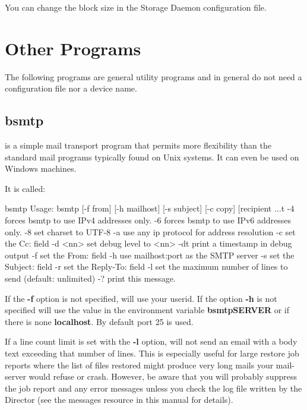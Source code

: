 You can change the block size in the Storage Daemon configuration file.




\section{Other Programs}

The following programs are general utility programs and in general do not need
a configuration file nor a device name.


\subsection{bsmtp}
\label{bsmtp}

 is a simple mail transport program that permits more flexibility
than the standard mail programs typically found on Unix systems. It can even
be used on Windows machines.

It is called:
\begin{commands}{bsmtp}
Usage: bsmtp [-f from] [-h mailhost] [-s subject] [-c copy] [recipient ...t
       -4          forces bsmtp to use IPv4 addresses only.
       -6          forces bsmtp to use IPv6 addresses only.
       -8          set charset to UTF-8
       -a          use any ip protocol for address resolution
       -c          set the Cc: field
       -d <nn>     set debug level to <nn>
       -dt         print a timestamp in debug output
       -f          set the From: field
       -h          use mailhost:port as the SMTP server
       -s          set the Subject: field
       -r          set the Reply-To: field
       -l          set the maximum number of lines to send (default: unlimited)
       -?          print this message.
\end{commands}

If the {\bf -f} option is not specified,  will use your userid. If
the option {\bf -h} is not specified  will use the value in the environment
variable {\bf bsmtpSERVER} or if there is none {\bf localhost}. By default
port 25 is used.

If a line count limit is set with the {\bf -l} option,  will
not send an email with a body text exceeding that number of lines. This
is especially useful for large restore job reports where the list of
files restored might produce very long mails your mail-server would
refuse or crash. However, be aware that you will probably suppress the
job report and any error messages unless you check the log file written
by the Director (see the messages resource in this manual for details).



